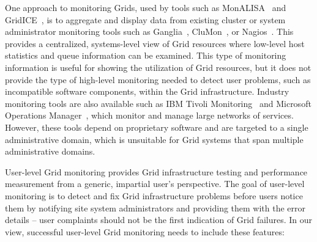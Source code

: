 \documentclass{sig-alternate}
\begin{document}
One approach to monitoring Grids, used by tools such as
MonALISA~\cite{monalisa} and GridICE~\cite{gridice}, is to aggregate and
display data from existing cluster or system administrator monitoring tools
such as Ganglia~\cite{ganglia}, CluMon~\cite{clumon}, or
Nagios~\cite{nagios}.  This provides a centralized, systems-level view of Grid
resources where low-level host statistics and queue information can be
examined.  This type of monitoring information is useful for showing the
utilization of Grid resources, but it does not provide the type of
high-level monitoring needed to detect user problems, such as incompatible
software components, within the Grid infrastructure.  Industry monitoring
tools are also available such as IBM Tivoli Monitoring~\cite{tivoli} and
Microsoft Operations Manager~\cite{mom}, which monitor and manage large
networks of services.  However, these tools depend on proprietary software and
are targeted to a single administrative domain, which is unsuitable for Grid
systems that span multiple administrative domains.

User-level Grid monitoring provides Grid infrastructure testing and performance measurement 
from a generic, impartial user's perspective.  The goal of user-level monitoring is 
to detect and fix Grid infrastructure problems before users notice them by
notifying site system administrators and providing them with the error details -- 
user complaints should not be the first indication of Grid failures.  
In our view, successful user-level Grid monitoring needs to include
these features:
\end{document}
